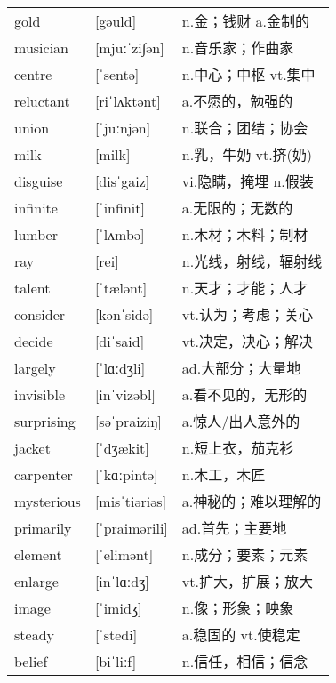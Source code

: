 \documentclass[a4paper]{article}
\begin{document}
\section{}
\begin{tabular}{l l l}

gold & [gəuld] & n.金；钱财 a.金制的 \\
musician & [mjuːˈzi∫ən] & n.音乐家；作曲家 \\
centre & [ˈsentə] & n.中心；中枢 vt.集中 \\
reluctant & [riˈlʌktənt] & a.不愿的，勉强的 \\
union & [ˈjuːnjən] & n.联合；团结；协会 \\
milk & [milk] & n.乳，牛奶 vt.挤(奶) \\
disguise & [disˈgaiz] & vi.隐瞒，掩埋 n.假装 \\
infinite & [ˈinfinit] & a.无限的；无数的 \\
lumber & [ˈlʌmbə] & n.木材；木料；制材 \\
ray & [rei] & n.光线，射线，辐射线 \\
talent & [ˈtælənt] & n.天才；才能；人才 \\
consider & [kənˈsidə] & vt.认为；考虑；关心 \\
decide & [diˈsaid] & vt.决定，决心；解决 \\
largely & [ˈlɑːdʒli] & ad.大部分；大量地 \\
invisible & [inˈvizəbl] & a.看不见的，无形的 \\
surprising & [səˈpraiziŋ] & a.惊人/出人意外的 \\
jacket & [ˈdʒækit] & n.短上衣，茄克衫 \\
carpenter & [ˈkɑːpintə] & n.木工，木匠 \\
mysterious & [misˈtiəriəs] & a.神秘的；难以理解的 \\
primarily & [ˈpraimərili] & ad.首先；主要地 \\
element & [ˈelimənt] & n.成分；要素；元素 \\
enlarge & [inˈlɑːdʒ] & vt.扩大，扩展；放大 \\
image & [ˈimidʒ] & n.像；形象；映象 \\
steady & [ˈstedi] & a.稳固的 vt.使稳定 \\
belief & [biˈliːf] & n.信任，相信；信念 \\

\end{tabular}
\end{document}
